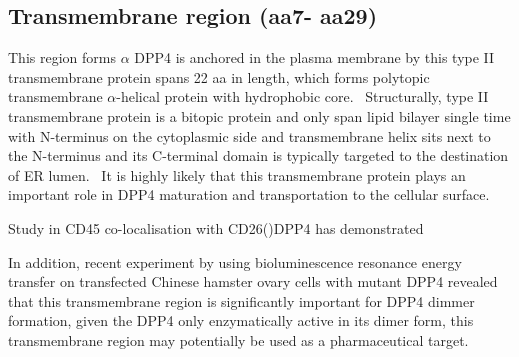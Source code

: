 \subsection{Transmembrane region (aa7- aa29)}

This region forms $\alpha$
DPP4 is anchored in the plasma membrane by this type II transmembrane protein spans 22 aa in length, which forms polytopic transmembrane $\alpha$-helical protein with hydrophobic core.~\cite{Hong_1990} Structurally, type II transmembrane protein is a bitopic protein and only span lipid bilayer single time with N-terminus on the cytoplasmic side and transmembrane helix sits next to the N-terminus and its C-terminal domain is typically targeted to the destination of ER lumen.~\cite{Luckey} It is highly likely that this transmembrane protein plays an important role in DPP4 maturation and transportation to the cellular surface. 
\par
Study in CD45 co-localisation with CD26()DPP4  has demonstrated 
\par
In addition, recent experiment by \citet{Chung_2010} using bioluminescence resonance energy transfer on transfected Chinese hamster ovary cells with mutant DPP4 revealed that this transmembrane region is significantly important for DPP4 dimmer formation, given the DPP4 only enzymatically active in its dimer form, this transmembrane region may potentially be used as a pharmaceutical target.
